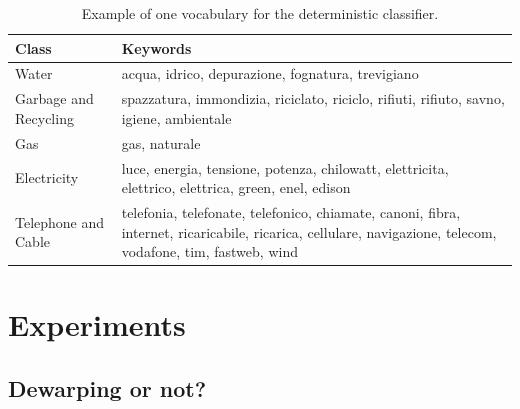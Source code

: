 \documentclass[10pt,twocolumn,letterpaper]{article}
\begin{document}
\bgroup
\def\arraystretch{1.3}%
\begin{table}[!h]
  \begin{center}
    \begin{tabular}{p{2cm} p{5cm}}
      \hline
      Class                 & Keywords                                                                                                                                                    \\ \hline
      Water                 & acqua, idrico, depurazione, fognatura, trevigiano                                                                                                           \\
      Garbage and Recycling & spazzatura, immondizia, riciclato, riciclo, rifiuti, rifiuto, savno, igiene, ambientale                                                                     \\
      Gas                   & gas, naturale                                                                                                                                               \\
      Electricity           & luce, energia, tensione, potenza, chilowatt, elettricita, elettrico, elettrica, green, enel, edison                                                         \\
      Telephone and Cable   & telefonia, telefonate, telefonico, chiamate, canoni, fibra, internet, ricaricabile, ricarica, cellulare, navigazione, telecom, vodafone, tim, fastweb, wind \\ \hline
    \end{tabular}
  \end{center}
  \label{table:determnistic-classifier-dict}
  \caption{Example of one vocabulary for the deterministic classifier.}
\end{table}
\egroup

\section{Experiments}
\label{sec:experiments}

\subsection{Dewarping or not?}
\label{subse:dewarping-or-not}
\end{document}

